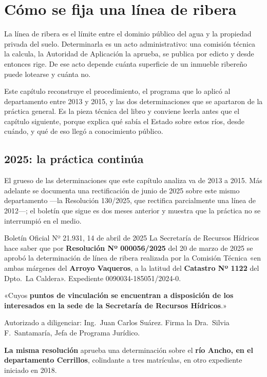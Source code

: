 \chapter{Cómo se fija una línea de ribera}

\label{cap:ribera}
La línea de ribera es el límite entre el dominio público del agua y la propiedad privada
del suelo. Determinarla es un acto administrativo: una comisión técnica la calcula, la
Autoridad de Aplicación la aprueba, se publica por edicto y desde entonces rige. De ese
acto depende cuánta superficie de un inmueble ribereño puede lotearse y cuánta no.

Este capítulo reconstruye el procedimiento, el programa que lo aplicó al departamento entre
2013 y 2015, y las dos determinaciones que se apartaron de la práctica general. Es la
pieza técnica del libro y conviene leerla antes que el capítulo siguiente, porque explica
qué sabía el Estado sobre estos ríos, desde cuándo, y qué de eso llegó a conocimiento
público.

\section{2025: la práctica continúa}

El grueso de las determinaciones que este capítulo analiza va de 2013 a 2015. Más adelante se
documenta una rectificación de junio de 2025 sobre este mismo departamento ---la Resolución 130/2025, que rectifica parcialmente una línea de 2012---; el boletín que
sigue es dos meses anterior y muestra que la práctica no se interrumpió en el medio.

\begin{ficha}{Boletín Oficial Nº 21.931, 14 de abril de 2025}
La Secretaría de Recursos Hídricos hace saber que por \textbf{Resolución Nº 000056/2025} del
20 de marzo de 2025 se aprobó la determinación de línea de ribera realizada por la Comisión
Técnica «en ambas márgenes del \textbf{Arroyo Vaqueros}, a la latitud del \textbf{Catastro
Nº 1122} del Dpto.\ La Caldera». Expediente 0090034-185051/2024-0.

«Cuyos \textbf{puntos de vinculación se encuentran a disposición de los interesados en la sede
de la Secretaría de Recursos Hídricos}.»

Autorizado a diligenciar: Ing.\ Juan Carlos Suárez. Firma la Dra.\ Silvia F.\ Santamaría,
Jefa de Programa Jurídico.

\textbf{La misma resolución} aprueba una determinación sobre el \textbf{río Ancho, en el
departamento Cerrillos}, colindante a tres matrículas, en otro expediente iniciado en 2018.
\end{ficha}

